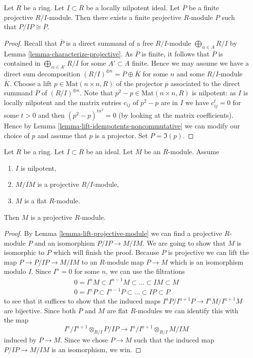 \begin{lemma}
\label{lemma-lift-finite-projective-module}
Let $R$ be a ring. Let $I \subset R$ be a locally nilpotent ideal. Let
$\overline{P}$ be a finite projective $R/I$-module. Then there exists a
finite projective $R$-module $P$ such that $P/IP \cong \overline{P}$.
\end{lemma}

\begin{proof}
Recall that $\overline{P}$ is a direct summand of a free $R/I$-module
$\bigoplus_{\alpha \in A} R/I$ by Lemma \ref{lemma-characterize-projective}.
As $\overline{P}$ is finite, it follows that $\overline{P}$ is contained
in $\bigoplus_{\alpha \in A'} R/I$ for some $A' \subset A$ finite.
Hence we may assume we have a direct sum decomposition
$(R/I)^{\oplus n} = \overline{P} \oplus \overline{K}$
for some $n$ and some $R/I$-module $\overline{K}$. Choose a lift
$p \in \text{Mat}(n \times n, R)$ of the projector $\overline{p}$
associated to the direct summand $\overline{P}$ of $(R/I)^{\oplus n}$.
Note that $p^2 - p \in \text{Mat}(n \times n, R)$ is nilpotent:
as $I$ is locally nilpotent and the matrix entries $c_{ij}$ of
$p^2 - p$ are in $I$ we have $c_{ij}^t = 0$ for some $t > 0$ and
then $(p^2 - p)^{tn^2} = 0$ (by looking at the matrix coefficients).
Hence by Lemma \ref{lemma-lift-idempotents-noncommutative}
we can modify our choice of $p$ and assume that $p$ is a projector.
Set $P = \Im(p)$.
\end{proof}

\begin{lemma}
\label{lemma-lift-projective}
Let $R$ be a ring.
Let $I \subset R$ be an ideal.
Let $M$ be an $R$-module.
Assume
\begin{enumerate}
\item $I$ is nilpotent,
\item $M/IM$ is a projective $R/I$-module,
\item $M$ is a flat $R$-module.
\end{enumerate}
Then $M$ is a projective $R$-module.
\end{lemma}

\begin{proof}
By Lemma \ref{lemma-lift-projective-module} we can find a projective
$R$-module $P$ and an isomorphism $P/IP \to M/IM$. We are going to show
that $M$ is isomorphic to $P$ which will finish the proof. Because $P$
is projective we can lift the map $P \to P/IP \to M/IM$ to an $R$-module
map $P \to M$ which is an isomorphism modulo $I$. Since $I^n = 0$
for some $n$, we can use the filtrations
\begin{align*}
0 = I^nM \subset I^{n - 1}M \subset \ldots \subset IM \subset M \\
0 = I^nP \subset I^{n - 1}P \subset \ldots \subset IP \subset P
\end{align*}
to see that it suffices to show that the induced maps
$I^aP/I^{a + 1}P \to I^aM/I^{a + 1}M$ are bijective. Since both $P$
and $M$ are flat $R$-modules we can identify this with the map
$$
I^a/I^{a + 1} \otimes_{R/I} P/IP
\longrightarrow
I^a/I^{a + 1} \otimes_{R/I} M/IM
$$
induced by $P \to M$. Since we chose $P \to M$ such that the induced
map $P/IP \to M/IM$ is an isomorphism, we win.
\end{proof}

